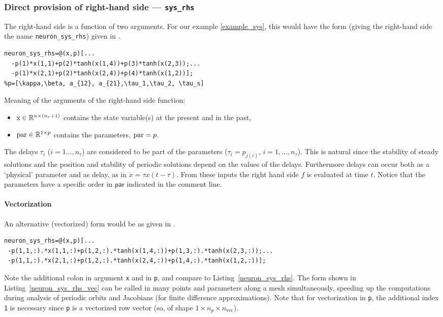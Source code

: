 \documentclass[10pt]{scrartcl}
\newcommand{\parm}[1]{\mathsf{#1}}
\newcommand{\RR}{\mathbb{R}}
\newcommand{\blist}[1]{\mbox{\lstinline!#1!}}
\begin{document}
\subsubsection{Direct provision of right-hand side --- \texorpdfstring{\blist{sys_rhs}}{sys\_rhs}}\label{sec:constrhs} 
The right-hand side is a function of two arguments. For our example
\eqref{example_sys}, this would have the form (giving the right-hand
side the name \blist{neuron_sys_rhs}) given in .
\begin{lstlisting}[float,frame=lines,label=neuron_sys_rhs,caption={Definition for right-hand side of \eqref{example_sys} as a variable. See \Cref{neuron_sys_rhs_vec} for the vectorized version.}]
neuron_sys_rhs=@(x,p)[...
  -p(1)*x(1,1)+p(2)*tanh(x(1,4))+p(3)*tanh(x(2,3));...
  -p(1)*x(2,1)+p(2)*tanh(x(2,4))+p(4)*tanh(x(1,2))];  
%p=[\kappa,\beta, a_{12}, a_{21},\tau_1,\tau_2, \tau_s]
\end{lstlisting}
Meaning of the arguments of the right-hand side function:
\begin{itemize}
\item $\blist{x}\in\RR^{n\times (n_\tau+1)}$ contains the state
variable(s) at the present and in the past,
\item $\blist{par}\in\RR^{1\times
  p}$ contains the parameters, $\blist{par}=p$.
\end{itemize}
The delays $\tau_i$ ($i=1\ldots,n_\tau$) are considered to be part of the
parameters ($\tau_i=p_{j(i)}$, $i=1,\ldots,n_\tau$).  This is natural
since the stability of steady solutions and the position and stability
of periodic solutions depend on the values of the delays.  Furthermore
delays can occur both as a `physical' parameter and as delay, as in
$\dot{x}=\tau x(t-\tau)$.  From these inputs the right hand side $f$
is evaluated at time $t$. Notice that the parameters have a specific
order in $\parm{par}$ indicated in the comment line.

\paragraph{Vectorization}
An alternative (vectorized) form would be as given in
.
\begin{lstlisting}[float,frame=lines,label=neuron_sys_rhs_vec,caption={Alternative definition of the right-hand side of \eqref{example_sys}, vectorized in \blist{x} and \blist{p} for speed-up of periodic orbit and bifurcation computations.}]
neuron_sys_rhs=@(x,p)[...
 -p(1,1,:).*x(1,1,:)+p(1,2,:).*tanh(x(1,4,:))+p(1,3,:).*tanh(x(2,3,:));...
 -p(1,1,:).*x(2,1,:)+p(1,2,:).*tanh(x(2,4,:))+p(1,4,:).*tanh(x(1,2,:))];
\end{lstlisting}
Note the additional colon in argument \blist{x} and in \blist{p}, and compare to
Listing~\ref{neuron_sys_rhs}. The form shown in
Listing~\ref{neuron_sys_rhs_vec} can be called in many points and parameters along a
mesh simultaneously, speeding up the computations during analysis of
periodic orbits and Jacobians (for finite difference approximations). Note that for vectorization in \blist{p}, the additional index \blist{1} is necessary since \blist{p} is a vectorized row vector (so, of shape $1\times n_p\times n_\mathrm{vec}$).
\end{document}

